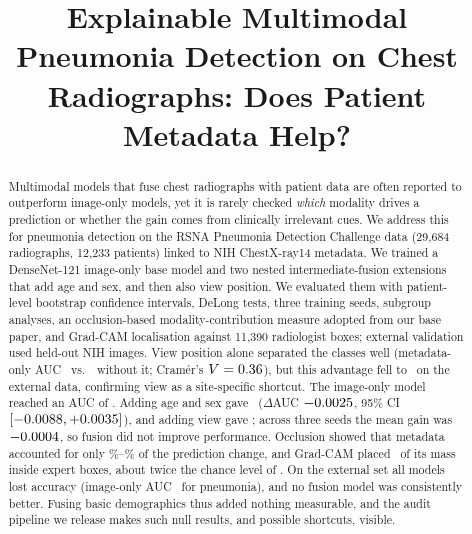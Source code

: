 \documentclass[conference]{IEEEtran}
\begin{document}
\title{Explainable Multimodal Pneumonia Detection on Chest Radiographs: Does Patient Metadata Help?}

\author{
\and
{}
}

\maketitle

\begin{abstract}
Multimodal models that fuse chest radiographs with patient data are often reported to outperform image-only models, yet it is rarely checked \emph{which} modality drives a prediction or whether the gain comes from clinically irrelevant cues. We address this for pneumonia detection on the RSNA Pneumonia Detection Challenge data (29,684 radiographs, 12,233 patients) linked to NIH ChestX-ray14 metadata. We trained a DenseNet-121 image-only base model and two nested intermediate-fusion extensions that add age and sex, and then also view position. We evaluated them with patient-level bootstrap confidence intervals, DeLong tests, three training seeds, subgroup analyses, an occlusion-based modality-contribution measure adopted from our base paper, and Grad-CAM localisation against 11,390 radiologist boxes; external validation used held-out NIH images. View position alone separated the classes well (metadata-only AUC \aucTabASV\ vs.\ \aucTabAS\ without it; Cram\'er's $V=0.36$), but this advantage fell to \extAucATabASV\ on the external data, confirming view as a site-specific shortcut. The image-only model reached an AUC of \aucImage. Adding age and sex gave \aucFusAS\ ($\Delta$AUC $-0.0025$, 95\% CI $[-0.0088, +0.0035]$), and adding view gave \aucFusASV; across three seeds the mean gain was $-0.0004$, so fusion did not improve performance. Occlusion showed that metadata accounted for only \shareFusAS\%--\shareFusASV\% of the prediction change, and Grad-CAM placed \energyImage\ of its mass inside expert boxes, about twice the chance level of \energyChance. On the external set all models lost accuracy (image-only AUC \extAucAImage\ for pneumonia), and no fusion model was consistently better. Fusing basic demographics thus added nothing measurable, and the audit pipeline we release makes such null results, and possible shortcuts, visible.
\end{abstract}
\end{document}
